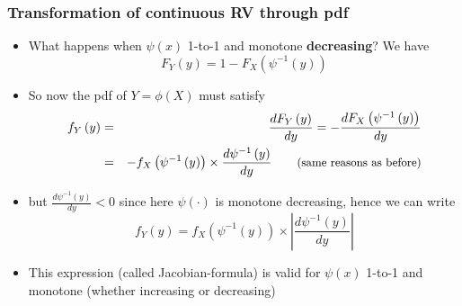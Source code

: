\documentclass[notes=show,smaller,handout]{beamer}\usepackage[]{graphicx}\usepackage[]{color}
\newenvironment{stepitemize}{\begin{itemize}[<+->]}{\end{itemize} }
\begin{document}
\begin{frame}%

\frametitle{Transformation of continuous RV through pdf }

\begin{stepitemize}
\item What happens when $\psi \left( x\right) $ 1-to-1 and monotone \textbf{%
decreasing}? We have%
\begin{equation*}
F_{Y}\left( y\right) =1-F_{X}\left( \psi ^{-1}\left( y\right) \right)
\end{equation*}

\item So now the pdf of $Y=\phi \left( X\right) $ must satisfy
\begin{eqnarray*}
f_{Y}\left( y\right) &=&\frac{dF_{Y}\left( y\right) }{dy}=-\frac{%
dF_{X}\left( \psi ^{-1}\left( y\right) \right) }{dy} \\
&=&-f_{X}\left( \psi ^{-1}\left( y\right) \right) \times \frac{d\psi
^{-1}\left( y\right) }{dy}\qquad \text{{\small (same reasons as before)}}
\end{eqnarray*}

\item but $\frac{d\psi ^{-1}\left( y\right) }{dy}<0$ since here $\psi \left(
\cdot \right) $ is monotone decreasing, hence we can write%
\begin{equation*}
f_{Y}\left( y\right) =f_{X}\left( \psi ^{-1}\left( y\right) \right) \times
\left\vert \frac{d\psi ^{-1}\left( y\right) }{dy}\right\vert
\end{equation*}

\item This expression (called Jacobian-formula) is valid for $\psi \left( x\right) $ 1-to-1 and
monotone (whether increasing or decreasing)
\end{stepitemize}

\end{frame}%
\end{document}
